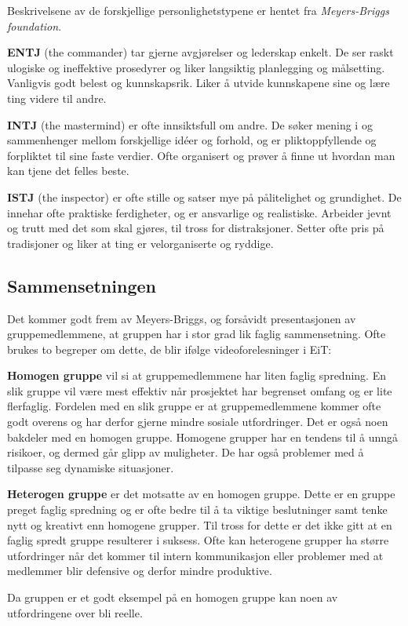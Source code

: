 Beskrivelsene av de forskjellige personlighetstypene er hentet fra \textit{Meyers-Briggs foundation}\citep{mbtypes}.
\vspace{\secspace}

\textbf{ENTJ} (the commander) tar gjerne avgjørelser og lederskap enkelt. 
De ser raskt ulogiske og ineffektive prosedyrer og liker langsiktig planlegging og målsetting. 
Vanligvis godt belest og kunnskapsrik. 
Liker å utvide kunnskapene sine og lære ting videre til andre. 
\vspace{\secspace}

\textbf{INTJ} (the mastermind) er ofte innsiktsfull om andre. 
De søker mening i og sammenhenger mellom forskjellige idéer og forhold, og er pliktoppfyllende og forpliktet til sine faste verdier. 
Ofte organisert og prøver å finne ut hvordan man kan tjene det felles beste. 

\textbf{ISTJ} (the inspector) er ofte stille og satser mye på pålitelighet og grundighet. 
De innehar ofte praktiske ferdigheter, og er ansvarlige og realistiske. 
Arbeider jevnt og trutt med det som skal gjøres, til tross for distraksjoner. 
Setter ofte pris på tradisjoner og liker at ting er velorganiserte og ryddige. 

\subsection{Sammensetningen}
Det kommer godt frem av Meyers-Briggs, og forsåvidt presentasjonen av gruppemedlemmene, at gruppen har i stor grad lik faglig sammensetning.
Ofte brukes to begreper om dette, de blir ifølge videoforelesninger\citep{video} i EiT: 
\vspace{\secspace}

\textbf{Homogen gruppe} vil si at gruppemedlemmene har liten faglig spredning. 
En slik gruppe vil være mest effektiv når prosjektet har begrenset omfang og er lite flerfaglig. 
Fordelen med en slik gruppe er at gruppemedlemmene kommer ofte godt overens og har derfor gjerne mindre sosiale utfordringer. 
Det er også noen bakdeler med en homogen gruppe. 
Homogene grupper har en tendens til å unngå risikoer, og dermed går glipp av muligheter. 
De har også problemer med å tilpasse seg dynamiske situasjoner.
\vspace{\secspace}

\textbf{Heterogen gruppe} er det motsatte av en homogen gruppe. 
Dette er en gruppe preget faglig spredning og er ofte bedre til å ta viktige beslutninger samt tenke nytt og kreativt enn homogene grupper. 
Til tross for dette er det ikke gitt at en faglig spredt gruppe resulterer i suksess. 
Ofte kan heterogene grupper ha større utfordringer når det kommer til intern kommunikasjon eller problemer med at medlemmer blir defensive og derfor mindre produktive. 
\vspace{\secspace}

Da gruppen er et godt eksempel på en homogen gruppe kan noen av utfordringene over bli reelle.
